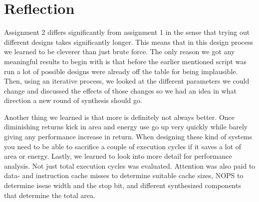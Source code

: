 \section{Reflection}
Assignment 2 differs significantly from assignment 1 in the sense that trying out different designs takes significantly longer.
This means that in this design process we learned to be cleverer than just brute force.
The only reason we got any meaningful results to begin with is that before the earlier mentioned script was run a lot of possible designs were already off the table for being implausible. Then, using an iterative process, we looked at the different parameters we could change and discussed the effects of those changes so we had an idea in what direction a new round of synthesis should go.

Another thing we learned is that more is definitely not always better.
Once diminishing returns kick in area and energy use go up very quickly while barely giving any performance increase in return.
When designing these kind of systems you need to be able to sacrifice a couple of execution cycles if it saves a lot of area or energy.
Lastly, we learned to look into more detail for performance analysis.
Not just total execution cycles was evaluated.
Attention was also paid to data- and instruction cache misses to determine suitable cache sizes, NOPS to determine issue width and the stop bit, and different synthesized components that determine the total area.